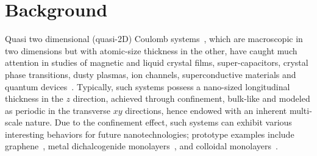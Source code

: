 \section{Background}



Quasi two dimensional (quasi-2D) Coulomb systems~\cite{mazars2011long}, which are macroscopic in two dimensions but with atomic-size thickness in the other, have caught much attention in studies of magnetic and liquid crystal films, super-capacitors, crystal phase transitions, dusty plasmas, ion channels, superconductive materials and quantum devices~\cite{kawamoto2002history, hille2001ionic, teng2003microscopic, Messina2017PRL, mazars2011long, saito2016highly, liu20192d}. 
Typically, such systems possess a nano-sized longitudinal thickness in the $z$ direction, achieved through confinement, bulk-like and modeled as periodic in the transverse $xy$ directions, hence endowed with an  inherent multi-scale nature.
Due to the confinement effect, such systems can exhibit various interesting behaviors for future nanotechnologies;
prototype examples include graphene~\cite{novoselov2004electric}, metal dichalcogenide monolayers~\cite{kumar2012tunable}, and colloidal monolayers~\cite{mangold2003phase}.


